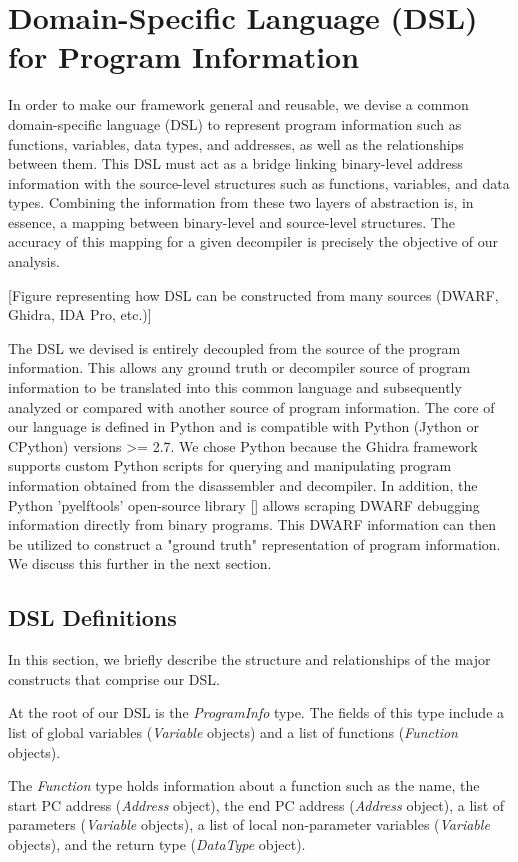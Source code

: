 \section{Domain-Specific Language (DSL) for Program Information}

In order to make our framework general and reusable, we devise a common domain-specific language (DSL) to represent program information such as functions, variables, data types, and addresses, as well as the relationships between them. This DSL must act as a bridge linking binary-level address information with the source-level structures such as functions, variables, and data types. Combining the information from these two layers of abstraction is, in essence, a mapping between binary-level and source-level structures. The accuracy of this mapping for a given decompiler is precisely the objective of our analysis.

[Figure representing how DSL can be constructed from many sources (DWARF, Ghidra, IDA Pro, etc.)]

The DSL we devised is entirely decoupled from the source of the program information. This allows any ground truth or decompiler source of program information to be translated into this common language and subsequently analyzed or compared with another source of program information. The core of our language is defined in Python and is compatible with Python (Jython or CPython) versions >= 2.7. We chose Python because the Ghidra framework supports custom Python scripts for querying and manipulating program information obtained from the disassembler and decompiler. In addition, the Python 'pyelftools' open-source library [] allows scraping DWARF debugging information directly from binary programs. This DWARF information can then be utilized to construct a "ground truth" representation of program information. We discuss this further in the next section.

\subsection{DSL Definitions}

In this section, we briefly describe the structure and relationships of the major constructs that comprise our DSL.

At the root of our DSL is the \emph{ProgramInfo} type. The fields of this type include a list of global variables (\emph{Variable} objects) and a list of functions (\emph{Function} objects).

The \emph{Function} type holds information about a function such as the name, the start PC address (\emph{Address} object), the end PC address (\emph{Address} object), a list of parameters (\emph{Variable} objects), a list of local non-parameter variables (\emph{Variable} objects), and the return type (\emph{DataType} object).

